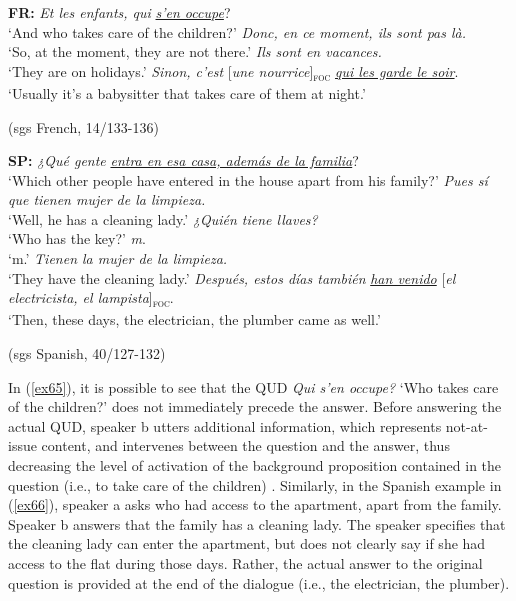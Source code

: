 \begin{description}
\ea \label{ex65} \textbf{FR:}
\ea \textit{Et les enfants, qui }\uline{\textit{s’en occupe}}?\\
`And who takes care of the children?'
\ex \textit{Donc, en ce moment, ils sont pas là.}\\
`So, at the moment, they are not there.'
 \textit{Ils sont en vacances.}\\
`They are on holidays.'
 \textit{Sinon, c'est} {[\textit{une nourrice}]\textsubscript{\textsc{foc}}} \normalsize \uline{\textit{qui les garde le soir}}.\\
‘Usually it's a babysitter that takes care of them at night.' 

\hfill (sgs French, 14/133-136)    
\z \z 

\ea \label{ex66} \textbf{SP:}
\ea \textit{¿Qué gente} \uline{\textit{entra en esa casa, además de la familia}}?\\
`Which other people have entered in the house apart from his family?'
\ex \textit{Pues sí que tienen mujer de la limpieza.}\\
`Well, he has a cleaning lady.'
 \textit{¿Quién tiene llaves?}\\
`Who has the key?'
 \textit{m}.\\  
`m.'
 \textit{Tienen la mujer de la limpieza.}\\ 
`They have the cleaning lady.'
 \textit{Después, estos días también} \uline{\textit{han venido}} {[\textit{el electricista, el lampista}]\textsubscript{\textsc{foc}}}\normalsize.\\
‘Then, these days, the electrician, the plumber came as well.' 

\hfill (sgs Spanish, 40/127-132)   
\z \z 

 In (\ref{ex65}), it is possible to see that the QUD \textit{Qui s'en occupe?} `Who takes care of the children?' does not immediately precede the answer. Before answering the actual QUD, speaker b utters additional information, which represents not-at-issue content, and intervenes between the question and the answer, thus decreasing the level of activation of the background proposition contained in the question (i.e., to take care of the children) . Similarly, in the Spanish example in (\ref{ex66}), speaker a asks who had access to the apartment, apart from the family. Speaker b answers that the family has a cleaning lady. The speaker specifies that the cleaning lady can enter the apartment, but does not clearly say if she had access to the flat during those days. Rather, the actual answer to the original question is provided at the end of the dialogue (i.e., the electrician, the plumber).


\end{description}
